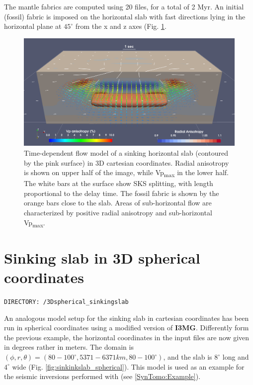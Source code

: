 The mantle fabrics are computed using 20 \vtptitle files, for a total of 2 Myr. An initial (fossil) fabric is imposed on the horizontal slab with fast directions lying in the horizontal plane at $45^{\circ}$ from the x and z axes (Fig. \ref{fig:sinkinkslab_cartesian}.

\begin{figure}[ht]
    \centering
    \includegraphics[width=1.0\textwidth]{cookbooks/3Dcartesian_sinkingslab2.png}
    \caption{Time-dependent flow model of a sinking horizontal slab (contoured by the pink surface) in 3D cartesian coordinates. Radial anisotropy is shown on upper half of the image, while Vp\textsubscript{max} in the lower half. The white bars at the surface show SKS splitting, with length proportional to the delay time. The fossil fabric is shown by the orange bars close to the slab. Areas of sub-horizontal flow are characterized by positive radial anisotropy and sub-horizontal Vp\textsubscript{max}.\\
    }
    \label{fig:sinkinkslab_cartesian}
\end{figure}

\vfill %

\section{Sinking slab in 3D spherical coordinates}
\label{section:cookbook_3Dspherical_sinking}

\texttt{DIRECTORY: /3Dspherical\_sinkingslab}

An analogous model setup for the sinking slab in cartesian coordinates has been run in spherical coordinates using a modified version of \textbf{I3MG}. Differently form the previous example, the horizontal coordinates in the input files are now given in degrees rather in meters. The domain is $(\phi,r,\theta)=(80-100^{\circ},5371-6371 km,80-100^{\circ})$, and the slab is $8^{\circ}$ long and $4^{\circ}$ wide (Fig. \ref{fig:sinkinkslab_spherical}).
This model is used as an example for the seismic inversions performed with \syntomotitle{} (see \ref{SynTomo:Example}).

